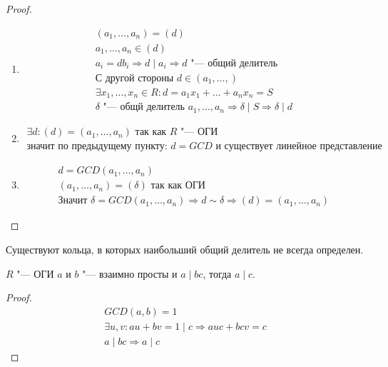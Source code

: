 \begin{proof}
	\begin{enumerate}
		\item 
		\begin{gather*}
			\left(a_{1}, \dots, a_{n}\right) = \left(d\right) \\
			a_{1}, \dots, a_{n} \in \left(d\right) \\
			a_{i} = db_{i} \Rightarrow d \mid a_{i} \Rightarrow d \text{ "--- общий делитель} \\
			\text{С другой стороны } d \in \left(a_{1}, \dots, \right) \\
			\exists x_{1}, \dots, x_{n} \in R \colon d = a_{1}x_{1} + \dots + a_{n}x_{n} = S \\
			\delta \text{ "--- общй делитель } a_{1}, \dots, a_{n} \Rightarrow \delta \mid S \Rightarrow \delta \mid d
		\end{gather*}
		\item
		\begin{gather*}
			\exists d \colon \left(d\right) = \left(a_{1}, \dots, a_{n}\right) \text{ так как } R \text{ "--- ОГИ} \\
			\text{значит по предыдущему пункту: } d = GCD \text{ и существует линейное представление}
		\end{gather*}
		\item
		\begin{gather*}
			d = GCD\left(a_{1}, \dots, a_{n}\right) \\
			\left(a_{1}, \dots, a_{n}\right) = \left(\delta\right) \text{ так как ОГИ}\\
			\text{Значит } \delta = GCD\left(a_{1}, \dots, a_{n}\right) \Rightarrow d \sim \delta \Rightarrow 
			\left(d\right) = \left(a_{1}, \dots, a_{n}\right)
		\end{gather*}
	\end{enumerate}
\end{proof}

\begin{Rem}
	Существуют кольца, в которых наибольший общий делитель не всегда определен.
\end{Rem}

\begin{theorem}{}
	$R$ "--- ОГИ $a$ и $b$ "--- взаимно просты и $a \mid bc$, тогда $a \mid c$.
\end{theorem}
\begin{proof}
	\begin{gather*}
		GCD\left(a, b\right) = 1 \\
		\exists u, v \colon au+bv = 1 \mid c \Rightarrow auc + bcv = c \\
		a \mid bc \Rightarrow a \mid c
	\end{gather*}
\end{proof}


